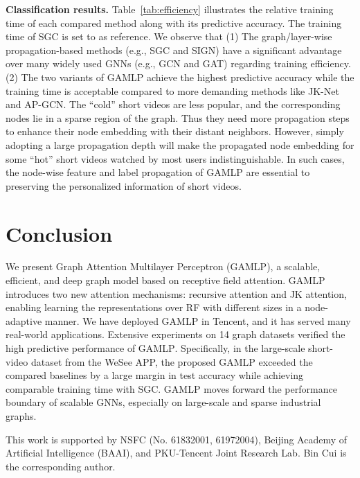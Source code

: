 \documentclass[sigconf]{acmart}
\newcommand{\sys}{\textsc{GAMLP}\xspace}
\begin{document}
\noindent\textbf{Classification results.} Table~\ref{tab:efficiency} illustrates the relative training time of each compared method along with its predictive accuracy.
The training time of SGC is set to  as reference.
We observe that (1) The graph/layer-wise propagation-based methods (e.g., SGC and SIGN) have a significant advantage over many widely used GNNs (e.g., GCN and GAT) regarding training efficiency.
(2) The two variants of GAMLP achieve the highest predictive accuracy while the training time is acceptable compared to more demanding methods like JK-Net and AP-GCN.
The ``cold'' short videos are less popular, and the corresponding nodes lie in a sparse region of the graph. Thus they need more propagation steps to enhance their node embedding with their distant neighbors. However, simply adopting a large propagation depth will make the propagated node embedding for some ``hot'' short videos watched by most users indistinguishable.
In such cases, the node-wise feature and label propagation of \sys are essential to preserving the personalized information of short videos.


\section{Conclusion}
We present Graph Attention Multilayer Perceptron (GAMLP), a scalable, efficient, and deep graph model based on receptive field attention. 
GAMLP introduces two new attention mechanisms: recursive attention and JK attention, enabling learning the representations over RF with different sizes in a node-adaptive manner. We have deployed \sys in Tencent, and it has served many real-world applications.
Extensive experiments on 14 graph datasets verified the high predictive performance of \sys. Specifically, in the large-scale short-video dataset from the WeSee APP, the proposed \sys exceeded the compared baselines by a large margin in test accuracy while achieving comparable training time with SGC.
\sys moves forward the performance boundary of scalable GNNs, especially on large-scale and sparse industrial graphs.

\begin{acks}
This work is supported by NSFC (No. 61832001, 61972004), Beijing Academy of Artificial Intelligence (BAAI), and PKU-Tencent Joint Research Lab. Bin Cui is the corresponding author.
\end{acks}





\end{document}
